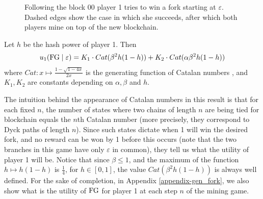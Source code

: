 \begin{figure}
\begin{center}
\end{center}
\caption{Following the block 00 player 1 tries to win a fork starting at $\varepsilon$. Dashed edges show the case in which she succeeds, after which both players mine on top of the new blockchain.}
\label{fig-fork_genesis}
\end{figure}

\begin{myprop}
	\label{prop:utility_gen_fork}
Let $h$ be the hash power of player 1. Then
	\begin{eqnarray*}
		u_1(\text{\rm FG}\mid\varepsilon) =K_1\cdot Cat(\beta^2h(1-h))+K_2\cdot Cat(\alpha\beta^2h(1-h))
	\end{eqnarray*}
where $Cat:x\mapsto \frac{1-\sqrt{1-4x}}{2x}$ is the generating function of Catalan numbers \cite{ADD_CITATION}, and $K_1,K_2$ are constants depending on $\alpha,\beta$ and $h$.
\end{myprop}

The intuition behind the appearance of Catalan numbers in this result is that for each fixed $n$, the number of states where two chains of length $n$ are being tied for blockchain equals the $n$th Catalan number (more precisely, they correspond to Dyck paths of length $n$). Since such states dictate when 1 will win the desired fork, and no reward can be won by 1 before this occurs (note that the two branches in this game have only $\varepsilon$ in common), they tell us what the utility of player 1 will be. Notice that since $\beta \leq 1$, and the maximum of the function $h\mapsto h(1-h)$ is $\frac{1}{4}$, for $h\in [0,1]$, the value $Cat(\beta^2h(1-h))$ is always well defined. For the sake of completion, in Appendix \ref{appendix-gen_fork}, we also show what is the utility of $\text{\rm FG}$ for player 1 at each step $n$ of the mining game.

